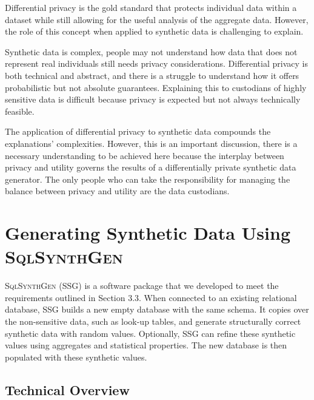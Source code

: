 \documentclass[11pt]{article}
\begin{document}


Differential privacy is the gold standard that protects individual data within a dataset while still allowing for the useful analysis of the aggregate data. However, the role of this concept when applied to synthetic data is challenging to explain. 

Synthetic data is complex, people may not understand how data that does not represent real individuals still needs privacy considerations. Differential privacy is both technical and abstract, and there is a struggle to understand how it offers probabilistic but not absolute guarantees. Explaining this to custodians of highly sensitive data is difficult because privacy is expected but not always technically feasible.


The application of differential privacy to synthetic data compounds the explanations' complexities. However, this is an important discussion, there is a necessary understanding to be achieved here because the interplay between privacy and utility governs the results of a differentially private synthetic data generator. The only people who can take the responsibility for managing the balance between privacy and utility are the data custodians.

 
\section{Generating Synthetic Data Using \textsc{SqlSynthGen}}

\textsc{SqlSynthGen} (SSG) is a software package that we developed to meet the requirements outlined in Section 3.3. When connected to an existing relational database, SSG builds a new empty database with the same schema. It copies over the non-sensitive data, such as look-up tables, and generate structurally correct synthetic data with random values. Optionally, SSG can refine these synthetic values using aggregates and statistical properties. The new database is then populated with these synthetic values.  

\subsection{Technical Overview}
\end{document}

